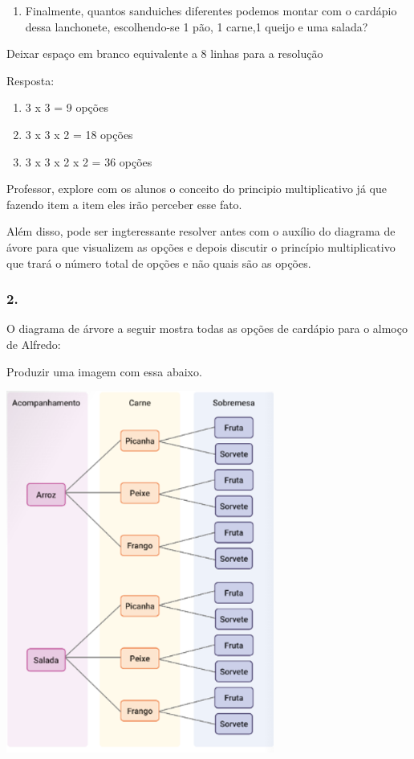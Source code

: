 \begin{enumerate}
\def\labelenumi{\alph{enumi})}
\item
  Finalmente, quantos sanduiches diferentes podemos montar com o
  cardápio dessa lanchonete, escolhendo-se 1 pão, 1 carne,1 queijo e uma
  salada?
\end{enumerate}

Deixar espaço em branco equivalente a 8 linhas para a resolução

Resposta:

\begin{enumerate}
\def\labelenumi{\alph{enumi})}
\item
  3 x 3 = 9 opções
\item
  3 x 3 x 2 = 18 opções
\item
  3 x 3 x 2 x 2 = 36 opções
\end{enumerate}

Professor, explore com os alunos o conceito do principio multiplicativo
já que fazendo item a item eles irão perceber esse fato.

Além disso, pode ser ingteressante resolver antes com o auxílio do
diagrama de ávore para que visualizem as opções e depois discutir o
princípio multiplicativo que trará o número total de opções e não quais
são as opções.

\subsubsection{2.}\label{section-131}

O diagrama de árvore a seguir mostra todas as opções de cardápio para o
almoço de Alfredo:

Produzir uma imagem com essa abaixo.

\includegraphics[width=3.46697in,height=4.68374in]{media/image138.png}

